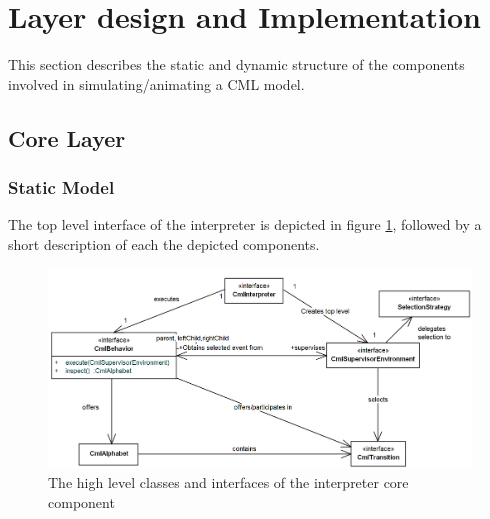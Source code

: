 \documentclass[a4paper, 10pt]{include/compassreport}   %
\begin{document}
\section{Layer design and Implementation}
This section describes the static and dynamic structure of the
components involved in simulating/animating a CML model.

\subsection{Core Layer}

\subsubsection{Static Model}
\label{sec:static_structure}
The top level interface of the interpreter is depicted in figure
\ref{fig:interpreter_topLevelStructure}, followed by a short
description of each the depicted components.
\begin{figure}[ht!]
  \begin{center}
    \includegraphics[width=1\textwidth]{figures/toplevelStructure}
    \caption{The high level classes and interfaces of the interpreter core component}
    \label{fig:interpreter_topLevelStructure}
  \end{center}
\end{figure}
\end{document}
